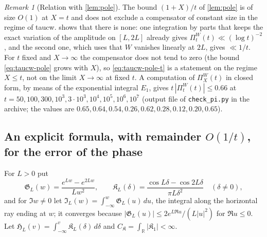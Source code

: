 \documentclass[11pt,a4paper]{article}
\numberwithin{equation}{section}
\theoremstyle{definition}
\theoremstyle{remark}
\newtheorem{remark}[theorem]{Remark}
\begin{document}
\begin{remark}[Relation with \cref{lem:pole}]\label{rem:taucw-pole}
The bound $(1+X)/t$ of \cref{lem:pole} is of size $O(1)$ at $X=t$ and does not exclude a compensator of constant size in the regime of taucw.  shows that there is none: one integration by parts that keeps the exact variation of the amplitude on $[L,2L]$ already gives $\Pi_t^W(t)\ll(\log t)^{-2}$, and the second one, which uses that $W$ vanishes linearly at $2L$, gives $\ll1/t$. For $t$ fixed and $X\to\infty$ the compensator does not tend to zero (the bound \eqref{eq:taucw-pole} grows with $X$), so \eqref{eq:taucw-pole-t} is a statement on the regime $X\le t$, not on the limit $X\to\infty$ at fixed $t$. A computation of $\Pi_X^W(t)$ in closed form, by means of the exponential integral $E_1$, gives $t\,|\Pi^W_t(t)|\le0.66$ at $t=50,100,300,10^3,3\cdot10^3,10^4,10^5,10^6,10^7$ (output file of \texttt{check\_pi.py} in the archive; the values are $0.65,0.64,0.54,0.26,0.62,0.28,0.12,0.20,0.65$).
\end{remark}

\subsection{An explicit formula, with remainder \texorpdfstring{$O(1/t)$}{O(1/t)}, for the error of the phase}\label{sec:taucw-exact}
For $L>0$ put
\begin{equation}\label{eq:kernel-G}
\mathfrak G_L(w)=\frac{e^{Lw}-e^{2Lw}}{Lw^2},\qquad
\mathfrak K_L(\delta)=\frac{\cos L\delta-\cos2L\delta}{\pi L\delta^2}\quad(\delta\neq0),
\end{equation}
and for $\Im w\ne0$ let $\mathfrak I_L(w)=\int_{-\infty}^{w}\mathfrak G_L(u)\,du$, the integral along the horizontal ray ending at $w$; it converges because $|\mathfrak G_L(u)|\le2e^{L\Re u}/(L|u|^2)$ for $\Re u\le0$. Let $\mathfrak H_L(v)=\int_{-\infty}^v\mathfrak K_L(\delta)\,d\delta$ and $C_{\mathfrak K}=\int_{\mathbb R}|\mathfrak K_1|<\infty$.
\end{document}

